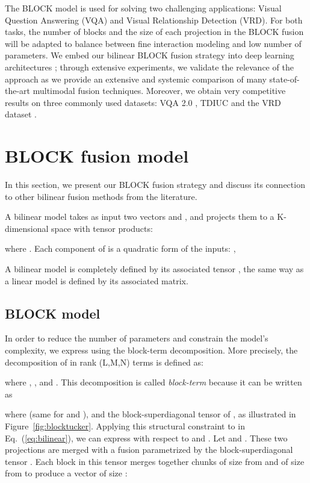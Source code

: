 \documentclass[letterpaper]{article} \usepackage{aaai19}  \usepackage{times}  \usepackage{helvet}  \usepackage{courier}  \usepackage{url}  \usepackage{graphicx}  \usepackage{booktabs}       \usepackage{comment}
\begin{document}
The BLOCK model is used for solving  two challenging applications: Visual Question Answering (VQA) and Visual Relationship Detection (VRD). 
For both tasks, the number of blocks and the size of each projection in the BLOCK fusion will be adapted to balance between fine interaction modeling and low number of parameters.
We embed our bilinear BLOCK fusion strategy into deep learning architectures ; through extensive experiments, we validate the relevance of the approach as we provide an extensive and systemic comparison of many state-of-the-art multimodal fusion techniques. Moreover, we obtain very competitive results on three commonly used datasets: VQA 2.0 \cite{Goyal_2017_CVPR}, TDIUC \cite{Kafle_2017_ICCV} and the VRD dataset \cite{VRD_Lu_2016_ECCV}.

\section{BLOCK fusion model}
\label{section:block}
In this section, we present our BLOCK fusion strategy and discuss its connection to other bilinear fusion methods from the literature.

A bilinear model takes as input two vectors  and , and projects them to a K-dimensional space with tensor products:

where . Each component of  is a quadratic form of the inputs: ,

A bilinear model is completely defined by its associated tensor , the same way as a linear model is defined by its associated matrix. 

\subsection{BLOCK model}
\label{subsection:block}
In order to reduce the number of parameters and constrain the model's complexity, we express  using the block-term decomposition. 
More precisely, the decomposition of  in rank (L,M,N) terms is defined as:

where , ,  and .
This decomposition is called \textit{block-term} because it can be written as  

where  (same for  and ), and  the block-superdiagonal tensor of , as illustrated in Figure~\ref{fig:blocktucker}.
Applying this structural constraint to  in Eq.~(\ref{eq:bilinear}), we can express  with respect to  and . Let  and . These two projections are merged with a fusion parametrized by the block-superdiagonal tensor . Each block in this tensor merges together chunks of size  from  and of size  from  to produce a vector of size :
\end{document}
